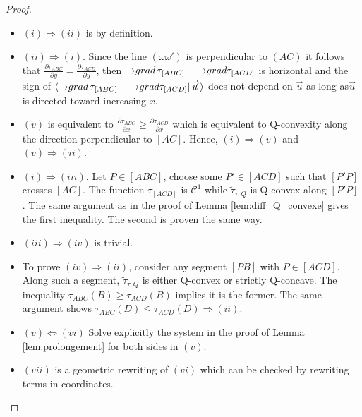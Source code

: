 \documentclass[a4paper,12pt]{article}
\def\grad{\overrightarrow{\mathbf{grad}}}
\def\grad{\mathrm{grad}}
\newcommand{\tautilde}[2]{\widetilde\tau_{#1,#2}}
\theoremstyle{definition}
\begin{document}
						\begin{proof}
						

						 \begin{itemize}
							\item $(i)\Rightarrow (ii)$ is by definition.
							\item $(ii)\Rightarrow (i)$. Since the line $(\omega\omega')$ is perpendicular to $(AC)$ it follows that $\frac{\partial\tau_{ABC}}{\partial y} = \frac{\partial\tau_{ACD}}{\partial y} $, then $\overrightarrow\grad\,\tau_{[ABC]}-\overrightarrow\grad \tau_{[ACD]}$ is horizontal and the sign of $\langle \overrightarrow\grad\,\tau_{[ABC]}-\overrightarrow\grad \tau_{[ACD]}| \overrightarrow u\rangle$ does not depend on $\overrightarrow u$ as long as$\overrightarrow u$ is directed toward increasing $x$. 
							\item $(v)$ is equivalent to $\frac{\partial\tau_{ABC}}{\partial x} \geq \frac{\partial\tau_{ACD}}{\partial x}$ which is equivalent to Q-convexity along the direction perpendicular to $[AC]$. Hence, $(i)\Rightarrow (v)$ and $(v)\Rightarrow (ii)$.
							\item $(i)\Rightarrow (iii)$. Let $P\in [ABC]$, choose some $P'\in [ACD]$ such that $[P'P]$ crosses $[AC]$. The function $\tau_{[ACD]}$ is $\mathscr C^1$ while $\tautilde{\tau}{Q}$ is Q-convex along $[P'P]$. The same argument as in the proof of Lemma \ref{lem:diff_Q_convexe} gives the first inequality. The second is proven the same way. 
							\item $(iii)\Rightarrow(iv)$ is trivial.
							
							\item To prove $(iv)\Rightarrow (ii)$, consider any segment $[PB]$ with $P\in [ACD]$. Along such a segment, $\tautilde{\tau}{Q}$ is either Q-convex or strictly Q-concave. The inequality $\tau_{ABC}(B)\geq \tau_{ACD}(B)$ implies it is the former. The same argument shows $\tau_{ABC}(D)\leq \tau_{ACD}(D) \Rightarrow (ii)$.
							
						 \item $(v)\Leftrightarrow (vi)$ Solve explicitly the system in the proof of Lemma \ref{lem:prolongement} for both sides in $(v)$.
						 \item $(vii)$ is a geometric rewriting of $(vi)$ which can be checked by rewriting terms in coordinates.
						 \end{itemize}\end{proof}
						
\end{document}
